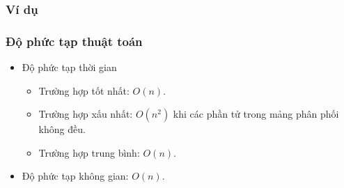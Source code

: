 \subsubsection{Ví dụ}

\subsubsection{Độ phức tạp thuật toán}

\begin{itemize}
	\item Độ phức tạp thời gian
	\begin{itemize}[label=$\circ$]
		\item Trường hợp tốt nhất: $O(n)$.
		\item Trường hợp xấu nhất: $O(n^2)$ khi các phần tử trong mảng phân phối không đều.
		\item Trường hợp trung bình: $O(n)$. 
	\end{itemize}
	
	\item Độ phức tạp không gian: $O(n)$.
\end{itemize}
